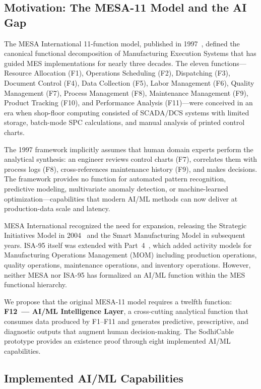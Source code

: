 \subsection{Motivation: The MESA-11 Model and the AI Gap}

The MESA International 11-function model, published in 1997~\cite{mesa1997},
defined the canonical functional decomposition of Manufacturing Execution
Systems that has guided MES implementations for nearly three decades.  The
eleven functions---Resource Allocation (F1), Operations Scheduling (F2),
Dispatching (F3), Document Control (F4), Data Collection (F5), Labor Management
(F6), Quality Management (F7), Process Management (F8), Maintenance Management
(F9), Product Tracking (F10), and Performance Analysis (F11)---were conceived in
an era when shop-floor computing consisted of SCADA/DCS systems with limited
storage, batch-mode SPC calculations, and manual analysis of printed control
charts.

The 1997 framework implicitly assumes that human domain experts perform the
analytical synthesis: an engineer reviews control charts (F7), correlates them
with process logs (F8), cross-references maintenance history (F9), and makes
decisions.  The framework provides no function for automated pattern recognition,
predictive modeling, multivariate anomaly detection, or machine-learned
optimization---capabilities that modern AI/ML methods can now deliver at
production-data scale and latency.

MESA International recognized the need for expansion, releasing the Strategic
Initiatives Model in 2004~\cite{mesa2004} and the Smart Manufacturing Model in
subsequent years.  ISA-95 itself was extended with Part~4~\cite{isa95part4},
which added activity models for Manufacturing Operations Management (MOM)
including production operations, quality operations, maintenance operations, and
inventory operations.  However, neither MESA nor ISA-95 has formalized
an AI/ML function within the MES functional hierarchy.

We propose that the original MESA-11 model requires a twelfth function:
\textbf{F12~--- AI/ML Intelligence Layer}, a cross-cutting analytical function
that consumes data produced by F1--F11 and generates predictive, prescriptive,
and diagnostic outputs that augment human decision-making.  The SodhiCable
prototype provides an existence proof through eight implemented AI/ML
capabilities.


\subsection{Implemented AI/ML Capabilities}

